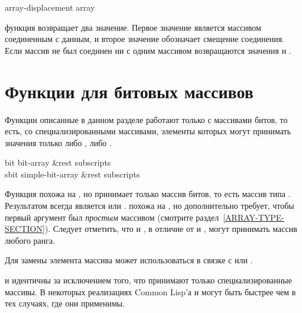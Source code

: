 \begin{defun}[Функция]
array-displacement array

функция возвращает два значение. Первое значение является массивом соединенным с
данным, и второе значение обозначает смещение соединения. Если массив не был
соединен ни с одним массивом возвращаются значения {\nil} и .
\end{defun}

\section{Функции для битовых массивов}

Функции описанные в данном разделе работают только с массивами битов, то есть,
со специализированными массивами, элементы которых могут принимать значения
только либо , либо .

\begin{defun}[Функция]
bit bit-array &rest subscripts \\
sbit simple-bit-array &rest subscripts

Функция  похожа на , но принимает только массив битов, то
есть массив типа .
Результатом всегда является  или .
 похожа на , но дополнительно требует, чтобы первый аргумент
был \emph{простым} массивом (смотрите раздел~\ref{ARRAY-TYPE-SECTION}).
Следует отметить, что  и , в отличие от  и
, могут принимать массив любого ранга.

Для замены элемента массива может использоваться  в связке с 
или .

 и  идентичны  за исключением того, что принимают
только специализированные массивы.
В некоторых реализациях Common Lisp'а  и  могут быть быстрее
чем  в
тех случаях, где они применимы.
\end{defun}

